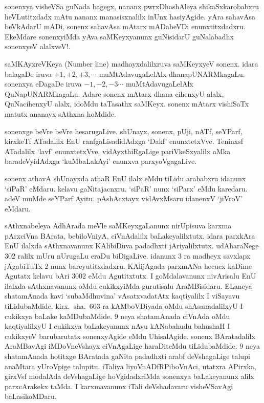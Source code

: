 sonenxya visheVSa guNada bagegx, nananx pwrxDhashAleya shikaSxkarobabxru heVLutitxdadx mAtu nananx manasisxnalilx inUnx hasiyAgide. yAra sahavAsa beVkAdarU mADi, sonenx sahavAsa mAtarx mADabeVDi enunxtitxdadxru. EkeMdare sonenxyiMda yAva saMKeyxyanunx guNisidarU guNalabadhx sonenxyeV alalxveV!.

saMKAyxreVKeya {\rm (Number line)} madhayxdalilxruva saMKeyxyeV sonenx. idara bala\-gaDe iruva $+1,+2,+3,\cdots$ muMtAdavugaLelAlx dhanapUNARMkagaLu. sonenxya eDagaDe iruva $-1,-2,-3\cdots$ muMtAdavugaLelAlx QuNapUNARMkagaLu. Adare sonenx mAtarx dhana cihenxyU alalx, QuNacihenxyU alalx, idoMdu taTasathx saMKeyx. sonenx mAtarx vishiSaTx matutx ananayx sAthxna hoMdide.

sonenxge beVre beVre hesarugaLive. shUnayx, sonenx, pUji, nATf, seYParf, kirxkeTf ATadalilx EnU ranfgaLisadidAdxga `Dakf' enunxtetxVve. Teninxsf ATadalilx `lavf' enunxtetxVve. vidAyxthiRgaLige pariVkeSxyalilx aMka baradeVyidAdxga `kuMbaLakAyi' enunxva parxyoVgagaLive.

sonenx athavA shUnayxda athaR EnU ilalx eMdu tiLidu arababxru idanunx `siPaR' eMdaru. kelavu gaNitajacnxru. `siPaR' nunx `siParx' eMdu karedaru. adeV muMde seYParf Ayitu. pAshAcxtayx vidAvxMsaru idanenxV `jiVroV' eMdaru.

sAthxnabeleya AdhArada meVle saMKeyxgaLanunx nirUpisuva karxma pArxciVna BArata, bebiloVniyA, ciVnAdalilx baLakeyalilxtutx. idara parxkAra EnU ilalxda sAthxnavanunx KAlibiDuva padadhxti jAriyalilxtutx. udAharaNege $302$ ralilx mUru nUrugaLu eraDu biDigaLive. idanunx $3$ ra madheyx savxlapx jAgabiTuTx $2$ nunx bareyutitxdadxru. KAli\-jAgada parxmANa hecucx kaDime Agutatx kelavu bAri $3002$ eMdu Agutitxtutx. I goMdalavanunx nivArisalu EnU ilalxda sAthxnavanunx oMdu cukikxyiMda gurutisalu AraMBisidaru. ELaneya shatamAnada kavi `subaMdhuvina' vAsatxvadatAtx kaqtiyalilx I viSayavu tiLidubaMdide. kirx.~sha.\ $603$ ra kAMboVDiyada oMdu shAsana\-dalilxyU I cukikxya baLake kaMDubaMdide. $9$ neya shatamAnada ciVnAda oMdu kaqtiyalilxyU I cukikxya baLakeyanunx nAvu kANabahudu bahushaH I cukikxyeV barubarutatx sonenxyAgide eMdu UhisalAgide. sonenx BAratadalilx AraMBavAgi iMDoVneVshayx ciVnAgaLige haraDiteMdu tiLidubaMdide. $9$ neya shatamAnada hotitxge BAratada gaNita \-padadhxti arabf deVshagaLige talupi anaMtara yUroVpige talupitu. iTaliya liyoVnADfRPiboVnAci, utatxra APirxka, girxVsf modalAda deVshagaLige hoVgidadxriMda sonenxya baLakeyanunx alilx parxcArakekx taMda. I karxmavanunx iTali deVshadavaru visheVSavAgi \-baLasikoMDaru.  

